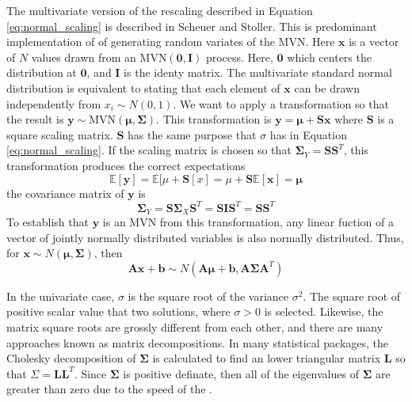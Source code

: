 The multivariate version of the rescaling described in Equation \ref{eq:normal_scaling} is described in Scheuer and Stoller\cite{scheuer1962_mvn_rv}.
This is predominant implementation of of generating random variates of the MVN.  Here $\bm{x}$ is a vector of $N$ values drawn from an $\mathrm{MVN}(\bm{0},\bm{I})$ process.  Here, $\bm{0}$ which centers the distribution at $\bm{0}$, and $\bm{I}$ is the identy matrix.  The multivariate standard normal distribution is equivalent to stating that each element of $\bm{x}$ can be drawn independently from $x_i \sim N(0,1)$.
We want to apply a transformation so that the result is $\bm{y} \sim \mathrm{MVN}(\bm{\mu},\bm{\Sigma})$.  This transformation is $\bm{y}=\bm{\mu} + \bm{S} \bm{x}$ where $\bm{S}$ is a square scaling matrix.  $\bm{S}$ has the same purpose that $\sigma$ has in Equation \ref{eq:normal_scaling}.
If the scaling matrix is chosen so that $\bm{\Sigma}_Y = \bm{S}\bm{S}^T$, this transformation produces the correct expectations
\begin{equation}
	  \mathbb{E}[\bm{y}]
		= \mathbb{E}[\mu + \bm{S}[x]
		= \mu + \bm{S} \mathbb{E}[\bm{x}]
		= \bm{\mu}
\end{equation}
the covariance matrix of $\bm{y}$ is
\begin{equation}
	\bm{\Sigma}_Y
	= \bm{S} \bm{\Sigma}_X \bm{S}^T
	= \bm{S} \bm{I} \bm{S}^T
	= \bm{S}\bm{S}^T
\end{equation}
To establish that $\bm{y}$ is an MVN from this transformation, any linear fuction of a vector of jointly normally distributed variables is also normally distributed\cite{greene2003}.  Thus, for $\bm{x} \sim N(\bm{\mu},\bm{\Sigma})$, then
\begin{equation}
    \bm{A} \bm{x} + \bm{b}
		\sim N(\bm{A} \bm{\mu} + \bm{b},
		       \bm{A} \bm{\Sigma} \bm{A}^T)
\end{equation}

In the univariate case, $\sigma$ is the square root of the variance $\sigma^2$.  The square root of positive scalar value that two solutions, where $\sigma > 0$ is selected.  Likewise, the matrix square roots are grossly different from each other, and there are many approaches known as matrix decompositions.  In many statistical packages, the Cholesky decomposition of $\bm{\Sigma}$ is calculated to find an lower triangular matrix $\bm{L}$ so that $\Sigma = \bm{L}\bm{L}^T$\cite{golub1996_matrices}.  Since $\bm{\Sigma}$ is positive definate, then all of the eigenvalues of $\bm{\Sigma}$ are greater than zero due to the speed of the .

